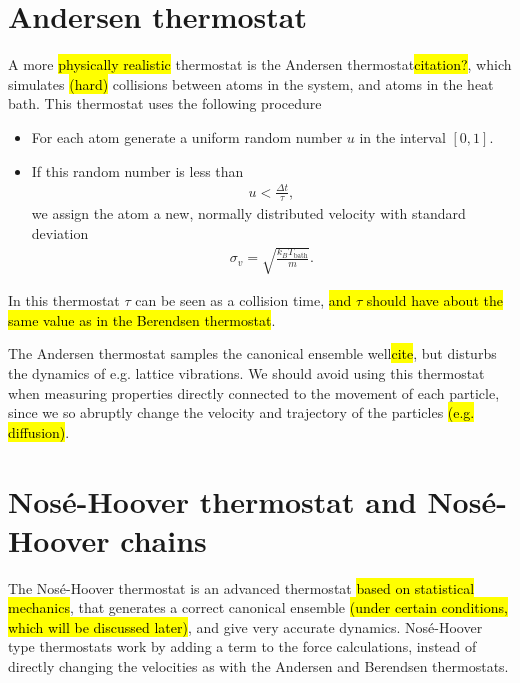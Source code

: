 \section{Andersen thermostat}
A more \hl{physically realistic} thermostat is the Andersen thermostat\hl{citation?}, which simulates \hl{(hard)} collisions between atoms in the system, and atoms in the heat bath. This thermostat uses the following procedure
%
\begin{itemize}
    \item For each atom generate a uniform random number $u$ in the interval $[0,1]$.
    \item If this random number is less than
        \begin{align*}
            u < \frac{\Delta t}{\tau},
        \end{align*}
        we assign the atom a new, normally distributed velocity with standard deviation
        \begin{align*}
            \sigma_v = \sqrt{\frac{k_B T_\text{bath}}{m}}.
        \end{align*}
\end{itemize}
%
In this thermostat $\tau$ can be seen as a collision time, \hl{and $\tau$ should have about the same value as in the Berendsen thermostat}.

The Andersen thermostat samples the canonical ensemble well\hl{cite}, but disturbs the dynamics of e.g. lattice vibrations. We should avoid using this thermostat when measuring properties directly connected to the movement of each particle, since we so abruptly change the velocity and trajectory of the particles \hl{(e.g. diffusion)}.

\section{Nos\'e-Hoover thermostat and Nos\'e-Hoover chains}
The Nos\'e-Hoover thermostat is an advanced thermostat \hl{based on statistical mechanics}, that generates a correct canonical ensemble \hl{(under certain conditions, which will be discussed later)}, and give very accurate dynamics\cite[section 6.1]{frenkel2001understanding}. Nosé-Hoover type thermostats work by adding a term to the force calculations, instead of directly changing the velocities as with the Andersen and Berendsen thermostats.


